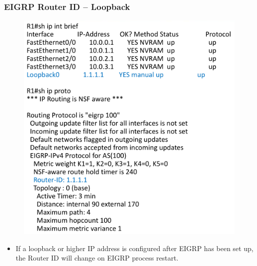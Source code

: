 \documentclass[pdflatex,compress,mathserif]{beamer}
\begin{document}
\begin{frame}
	\frametitle{EIGRP Router ID – Loopback}
	\begin{multicols}{2}
		\begin{figure}
			\centering
			\includegraphics[width=\linewidth]{img/img21}
		\end{figure}
		\columnbreak
		\begin{itemize}
			\item If a loopback or higher IP
address is configured after
EIGRP has been set up, the
Router ID will change on
EIGRP process restart.
		\end{itemize}
	\end{multicols}	
\end{frame}
\end{document}
